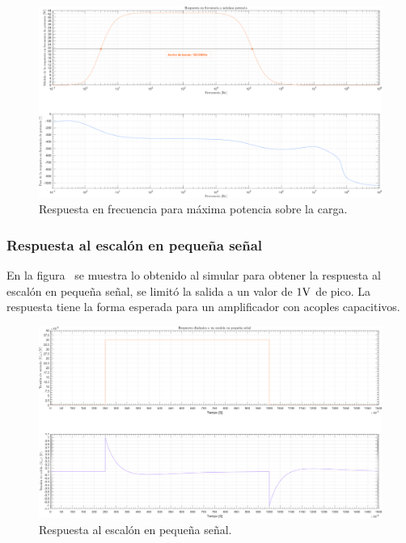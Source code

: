 \begin{figure}[H] %
\begin{center}
\includegraphics[width=0.9 \textwidth, angle=90]{./img/puntos/P11e_Power_BW.png}
\caption{\label{fig:fig_RF_MAX_POWER}\footnotesize{Respuesta en frecuencia para máxima potencia sobre la carga.}}
\end{center}
\end{figure}


\clearpage

\subsubsection{Respuesta al escalón en pequeña señal}

En la figura~ se muestra lo obtenido al simular para obtener la respuesta al escalón en pequeña señal, se limitó la salida a un valor de $1 \si[per-mode=symbol]{\volt}$ de pico. La respuesta tiene la forma esperada para un amplificador con acoples capacitivos.

\begin{figure}[H] %
\begin{center}
\includegraphics[width=0.9 \textwidth, angle=90]{./img/puntos/P11f_I_step_small_signal.png}
\caption{\label{fig:fig_step_small_signal}\footnotesize{Respuesta al escalón en pequeña señal.}}
\end{center}
\end{figure}


